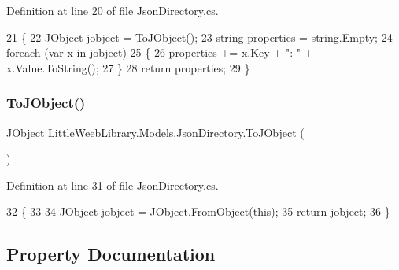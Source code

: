 Definition at line 20 of file Json\+Directory.\+cs.


\begin{DoxyCode}
21         \{
22             JObject jobject = \mbox{\hyperlink{class_little_weeb_library_1_1_models_1_1_json_directory_ab50f54381142e811a8a1289d4b5e83e7}{ToJObject}}();
23             \textcolor{keywordtype}{string} properties = \textcolor{keywordtype}{string}.Empty;
24             \textcolor{keywordflow}{foreach} (var x \textcolor{keywordflow}{in} jobject)
25             \{
26                 properties += x.Key + \textcolor{stringliteral}{": "} + x.Value.ToString();
27             \}
28             \textcolor{keywordflow}{return} properties;
29         \}
\end{DoxyCode}
\mbox{\label{class_little_weeb_library_1_1_models_1_1_json_directory_ab50f54381142e811a8a1289d4b5e83e7}} 
\subsubsection{\texorpdfstring{To\+J\+Object()}{ToJObject()}}
{\footnotesize\ttfamily J\+Object Little\+Weeb\+Library.\+Models.\+Json\+Directory.\+To\+J\+Object (\begin{DoxyParamCaption}{ }\end{DoxyParamCaption})}



Definition at line 31 of file Json\+Directory.\+cs.


\begin{DoxyCode}
32         \{
33 
34             JObject jobject = JObject.FromObject(\textcolor{keyword}{this});
35             \textcolor{keywordflow}{return} jobject;
36         \}
\end{DoxyCode}


\subsection{Property Documentation}
\mbox{\label{class_little_weeb_library_1_1_models_1_1_json_directory_ac6178c963cbe9e15834066ed048fc1d9}} 
